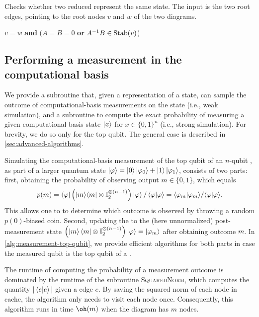 \begin{algorithm}
	\caption{Checks whether two reduced \limdds represent the same state. The input is the two root edges, pointing to the root nodes $v$ and $w$ of the two diagrams.}
	\label{alg:equality-check}
	\begin{algorithmic}[1]
			\State 
            \Return  $v=w  $ \textbf{and}  ($A = B = 0$ \textbf{or} $A^{-1}B\in \Stab(v)$)
		\EndProcedure
	\end{algorithmic}
\end{algorithm}


\subsection{Performing a measurement in the computational basis}
\label{sec:measurement}

We provide a subroutine that, given a \limdd representation of a state, can sample the outcome of computational-basis measurements on the state (i.e., weak simulation), and a subroutine to compute the exact probability of measuring a given computational basis state $\ket{x}$ for $x\in \{0,1\}^n$ (i.e., strong simulation).
For brevity, we do so only for the top qubit. The general case is described in \autoref{sec:advanced-algorithms}.


Simulating the computational-basis measurement of the top qubit of an $n$-qubit \limdd, as part of a larger quantum state $\ket{\phi} = \ket{0} \ket{\phi_0} + \ket{1} \ket{\phi_1}$, consists of two parts: first, obtaining the probability of observing output $m\in\{0, 1\}$, which equals 
\[
    p(m) = \bra{\phi} \left(\dyad{m} \otimes \id[2]^{\otimes (n-1)}\right) \ket{\phi}/\braket{\phi|\phi} = \langle \phi_m | \phi_m \rangle / \langle \phi | \phi \rangle.
\]
This allows one to to determine which outcome is observed by throwing a random $p(0)$-biased coin.
Second, updating the \limdd to the (here unnormalized) post-measurement state $\left(\ket{m}\bra{m} \otimes \id[2]^{\otimes (n-1)}\right) \ket{\phi} = \ket{\phi_m}$ after obtaining outcome $m$.
In \autoref{alg:measurement-top-qubit}, we provide efficient algorithms for both parts in case the measured qubit is the top qubit of a \limdd.

The runtime of computing the probability of a measurement outcome is dominated by the runtime of the subroutine \textsc{SquaredNorm}, which computes the quantity $|\braket{e|e}|$ given a \limdd edge $e$.
By saving the squared norm of each node in cache, the algorithm only needs to visit each node once.
Consequently, this algorithm runs in time $\oh(m)$ when the diagram has $m$ nodes.



